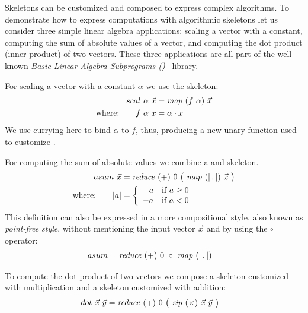 Skeletons can be customized and composed to express complex algorithms.
To demonstrate how to express computations with algorithmic skeletons let us consider three simple linear algebra applications:
scaling a vector with a constant, computing the sum of absolute values of a vector, and computing the dot product (\aka inner product) of two vectors.
These three applications are all part of the well-known \emph{Basic Linear Algebra Subprograms (\BLAS)}~\cite{Dongarra2002,Dongarra2002a} library.

For scaling a vector with a constant $\alpha$ we use the \map skeleton:
\begin{align*}
  scal\ \alpha\ \vec{x}&= \text{\textit{map}}\ (f\ \alpha)\ \vec{x}\\
  \text{where:} \qquad f\ \alpha\ x &= \alpha \cdot x
\end{align*}
We use currying here to bind $\alpha$ to $f$, thus, producing a new unary function used to customize \map.

For computing the sum of absolute values we combine a \map and \reduce skeleton.
\begin{align*}
  asum\ \vec{x} &= \text{\textit{reduce}}\ (+)\ 0\ \big(\ \text{\textit{map}}\ (|\, .\, |)\ \vec{x}\ \big)\\
  \text{where:} \qquad | a | &=
    \left\{
      \begin{array}{r l}
      a & \text{if } a \geq 0\\
      -a & \text{if } a < 0
      \end{array}
    \right.
\end{align*}
This definition can also be expressed in a more compositional style, also known as \emph{point-free style}, without mentioning the input vector $\vec{x}$ and by using the $\circ$ operator:
\begin{align*}
  asum &= \text{\textit{reduce}}\ (+)\ 0\ \circ\ \text{\textit{map}}\ (|\, .\, |)
\end{align*}

To compute the dot product of two vectors we compose a \zip skeleton customized with multiplication and a \reduce skeleton customized with addition:
\begin{align*}
  dot\ \vec{x}\ \vec{y} &= \text{\textit{reduce}}\ (+)\ 0\ \big(\ \text{\textit{zip}}\ (\times)\ \vec{x}\ \vec{y}\ \big)
\end{align*}

